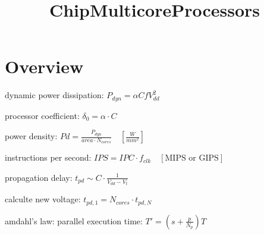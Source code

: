 \documentclass[english]{latex4ei/latex4ei_sheet}
\title{ChipMulticoreProcessors}
\begin{document}
\maketitle   %



\section{Overview}


dynamic power dissipation: $P_{dyn} = \alpha C f V_{dd}^2$

processor coefficient: $\delta_0 = \alpha \cdot C$

power density: $ Pd = \frac{P_{dyn}}{area \cdot N_{cores}} \quad [\frac{W}{mm^2}]$

instructions per second: $ IPS = IPC \cdot f_{clk} \quad [\text{MIPS or GIPS}]$ 

propagation delay: $t_{pd} \sim C \cdot \frac{1}{V_{dd} - V_t} $

calculte new voltage: $t_{pd,1} = N_{cores} \cdot t_{pd,N}$

amdahl's law: parallel execution time: $T' = (s + \frac{p}{N_p}) T$









\end{document}
